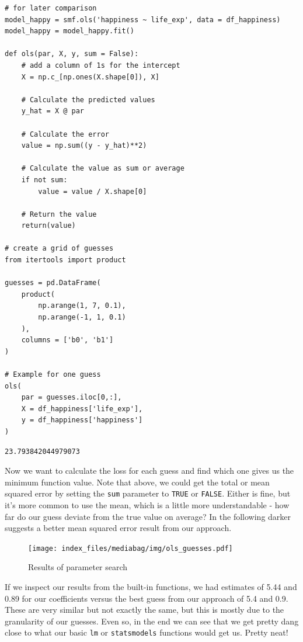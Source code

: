 \documentclass[
  letterpaper,
]{krantz}
\begin{document}
\begin{verbatim}
# for later comparison
model_happy = smf.ols('happiness ~ life_exp', data = df_happiness)
model_happy = model_happy.fit()

def ols(par, X, y, sum = False):
    # add a column of 1s for the intercept
    X = np.c_[np.ones(X.shape[0]), X]

    # Calculate the predicted values
    y_hat = X @ par
    
    # Calculate the error
    value = np.sum((y - y_hat)**2)
    
    # Calculate the value as sum or average
    if not sum:
        value = value / X.shape[0]
    
    # Return the value
    return(value)

# create a grid of guesses
from itertools import product

guesses = pd.DataFrame(
    product(
        np.arange(1, 7, 0.1),
        np.arange(-1, 1, 0.1)
    ),
    columns = ['b0', 'b1']
)

# Example for one guess
ols(
    par = guesses.iloc[0,:],
    X = df_happiness['life_exp'],
    y = df_happiness['happiness']
)
\end{verbatim}

\begin{verbatim}
23.793842044979073
\end{verbatim}

Now we want to calculate the loss for each guess and find which one
gives us the minimum function value. Note that above, we could get the
total or mean squared error by setting the \texttt{sum} parameter to
\texttt{TRUE} or \texttt{FALSE}. Either is fine, but it's more common to
use the mean, which is a little more understandable - how far do our
guess deviate from the true value on average? In the following darker
suggests a better mean squared error result from our approach.

\begin{figure}

{\centering \texttt{[image: index\_files/mediabag/img/ols\_guesses.pdf]}

}

\caption{Results of parameter search}

\end{figure}

If we inspect our results from the built-in functions, we had estimates
of 5.44 and 0.89 for our coefficients versus the best guess from our
approach of 5.4 and 0.9. These are very similar but not exactly the
same, but this is mostly due to the granularity of our guesses. Even so,
in the end we can see that we get pretty dang close to what our basic
\texttt{lm} or \texttt{statsmodels} functions would get us. Pretty neat!
\end{document}
